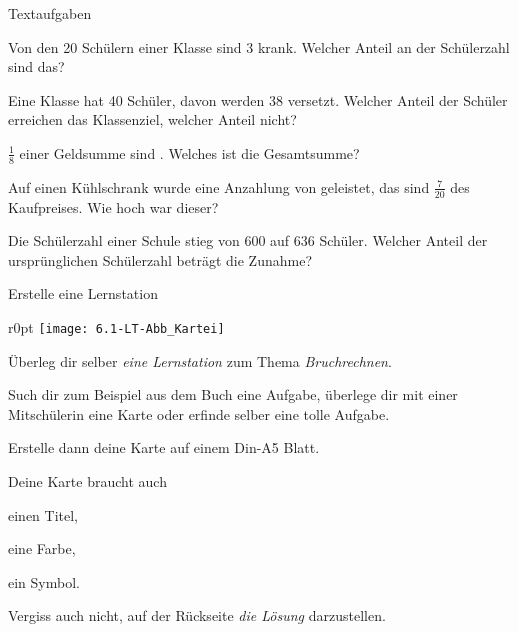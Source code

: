 \documentclass[12pt,a5paper,landscape]{scrartcl}
\begin{document}
	\begin{karte2}{Textaufgaben}
		\begin{enumeratea}
			\item Von den 20 Schülern einer Klasse sind 3 krank. Welcher Anteil an der Schülerzahl sind das?
			
			\item Eine Klasse hat 40 Schüler, davon werden 38 versetzt. Welcher Anteil der Schüler erreichen das Klassenziel, welcher Anteil nicht?
			
			\item $\tfrac{1}{8}$ einer Geldsumme sind . Welches ist die Gesamtsumme?
			
			\item Auf einen Kühlschrank wurde eine Anzahlung von  geleistet, das sind $\tfrac{7}{20}$ des Kaufpreises. Wie hoch war dieser?
			
			\item Die Schülerzahl einer Schule stieg von 600 auf 636 Schüler. Welcher Anteil der ursprünglichen Schülerzahl beträgt die Zunahme?
		\end{enumeratea}
	\end{karte2}
	
	\leereKarte
	
	\begin{karte3}[\symPartner]{Erstelle eine Lernstation}
		\vspace*{1cm}
		\begin{wrapfigure}{r}{0pt}
			\texttt{[image: 6.1-LT-Abb\_Kartei]}
		\end{wrapfigure}
		Überleg dir selber \emph{eine Lernstation} zum Thema \emph{Bruchrechnen}.
		
		Such dir zum Beispiel aus dem Buch eine Aufgabe, überlege dir mit einer Mitschülerin eine Karte oder erfinde selber eine tolle Aufgabe.
		
		Erstelle dann deine Karte auf einem Din-A5 Blatt.
		
		Deine Karte braucht auch
		\begin{smallitemize}
			\item einen Titel,
			\item eine Farbe,
			\item ein Symbol.
		\end{smallitemize}
		
		Vergiss auch nicht, auf der Rückseite \emph{die Lösung} darzustellen.

	\end{karte3}
	
	\leereKarte
	
\end{document}
